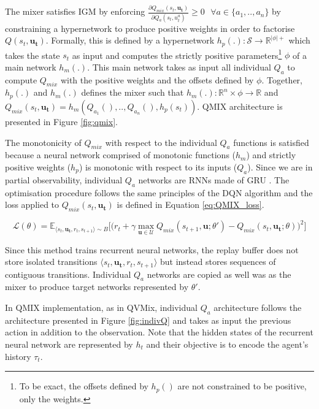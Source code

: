 The mixer satisfies IGM by enforcing $\frac{\partial Q_{mix}(s_t, \mathbf{u_t})}{\partial Q_{a}(s_t, u_t^{a})} \geq 0 \text{ } \forall a \in \{a_1,..,a_n\}$ by constraining a hypernetwork \citep{Ha2016HyperNetworks} to produce positive weights in order to factorise $Q(s_t, \mathbf{u_t})$.
Formally, this is defined by a hypernetwork $h_p(.): \mathcal{S} \rightarrow \mathbb{R}^{|\phi|+}$ which takes the state $s_t$ as input and computes the strictly positive parameters\footnote{To be exact, the offsets defined by $h_p()$ are not constrained to be positive, only the weights.} $\phi$ of a main network $h_m(.)$.
This main network takes as input all individual $Q_a$ to compute $Q_{mix}$ with the positive weights and the offsets defined by $\phi$.
Together, $h_p(.)$ and $h_m(.)$ defines the mixer such that $h_m(.): \mathbb{R}^n \times \phi \rightarrow \mathbb{R}$ and $Q_{mix}(s_t, \mathbf{u_t}) = h_m\left(Q_{a_1}(),..,Q_{a_n}(), h_p(s_t)\right)$.
QMIX architecture is presented in Figure \ref{fig:qmix}.

The monotonicity of $Q_{mix}$ with respect to the individual $Q_a$ functions is satisfied because a neural network comprised of monotonic functions ($h_m$) and strictly positive weights ($h_p$) is monotonic with respect to its inputs ($Q_a$). 
Since we are in partial observability, individual $Q_a$ networks are RNNs made of GRU \citep{Chung2014EmpiricalModeling}.
The optimisation procedure follows the same principles of the DQN algorithm and the loss applied to $Q_{mix}(s_t, \mathbf{u_t})$ is defined in Equation \ref{eq:QMIX_loss}.

\begin{equation}
    \mathcal{L}(\theta) = \mathbb{E}_{\langle s_{t},\mathbf{u_{t}},r_{t},s_{t+1} \rangle \sim B}
    \bigg[  
    \big(r_{t} + \gamma \max_{\mathbf{u} \in \mathcal{U}} Q_{mix}(s_{t+1}, \mathbf{u}; \theta')
    - Q_{mix}(s_{t}, \mathbf{u_{t}}; \theta)\big)^{2}
    \bigg] 
    \label{eq:QMIX_loss}
\end{equation}

Since this method trains recurrent neural networks, the replay buffer does not store isolated transitions $\langle s_{t},\mathbf{u_{t}},r_{t},s_{t+1}\rangle$ but instead stores sequences of contiguous transitions.
Individual $Q_a$ networks are copied as well was as the mixer to produce target networks represented by $\theta'$.

In QMIX implementation, as in QVMix, individual $Q_a$ architecture follows the architecture presented in Figure \ref{fig:indivQ} and takes as input the previous action in addition to the observation.
Note that the hidden states of the recurrent neural network are represented by $h_t$ and their objective is to encode the agent's history $\tau_t$.




